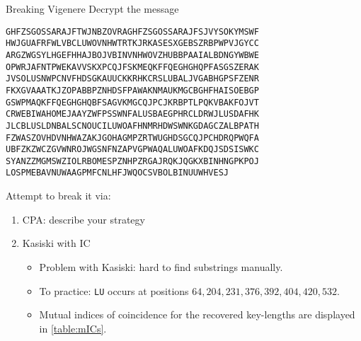 \documentclass{practice}
\begin{document}
\begin{task}{Breaking Vigenere}
  Decrypt the message
\begin{Verbatim}
GHFZSGOSSARAJFTWJNBZOVRAGHFZSGOSSARAJFSJVYSOKYMSWF
HWJGUAFRFWLVBCLUWOVNHWTRTKJRKASESXGEBSZRBPWPVJGYCC
ARGZWGSYLHGEFHHAJBOJVBINVNHWOVZHUBBPAAIALBDNGYWBWE
OPWRJAFNTPWEKAVVSKXPCQJFSKMEQKFFQEGHGHQPFASGSZERAK
JVSOLUSNWPCNVFHDSGKAUUCKKRHKCRSLUBALJVGABHGPSFZENR
FKXGVAAATKJZOPABBPZNHDSFPAWAKNMAUKMGCBGHFHAISOEBGP
GSWPMAQKFFQEGHGHQBFSAGVKMGCQJPCJKRBPTLPQKVBAKFOJVT
CRWEBIWAHOMEJAAYZWFPSSWNFALUSBAEGPHRCLDRWJLUSDAFHK
JLCBLUSLDNBALSCNOUCILUWOAFHNMRHDWSWNKGDAGCZALBPATH
FZWASZOVHDVNHWAZAKJGOHAGMPZRTWUGHDSGCQJPCHDRQPWQFA
UBFZKZWCZGVWNROJWGSNFNZAPVGPWAQALUWOAFKDQJSDSISWKC
SYANZZMGMSWZIOLRBOMESPZNHPZRGAJRQKJQGKXBINHNGPKPOJ
LOSPMEBAVNUWAAGPMFCNLHFJWQOCSVBOLBINUUWHVESJ
\end{Verbatim}
  Attempt to break it via:
  \begin{enumerate}
    \item CPA: describe your strategy
    \item Kasiski with IC
    \begin{itemize}
      \item Problem with Kasiski: hard to find substrings manually\footnotemark{}.
      \item To practice: \texttt{LU} occurs at positions $64, 204, 231, 376, 392, 404, 420, 532$.
      \item Mutual indices of coincidence for the recovered\footnotemark{} key-lengths are displayed in \autoref{table:mICs}.
    \end{itemize}
  \end{enumerate}
\end{task}

\newpage
\end{document}
